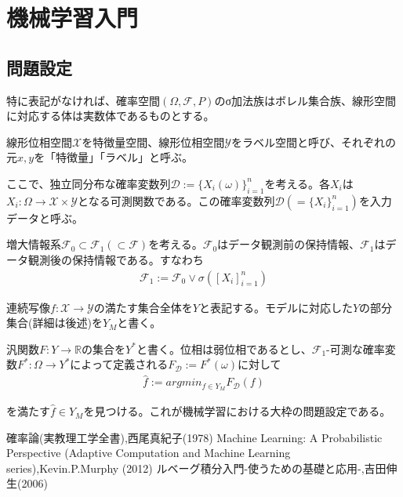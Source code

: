 \documentclass[dvipdfmx, a4paper]{jsarticle}
\begin{document}
\newpage
\section{機械学習入門}
\subsection{問題設定}
特に表記がなければ、確率空間$(\Omega,\mathcal{F},P)$のσ加法族はボレル集合族、線形空間に対応する体は実数体であるものとする。

線形位相空間$\mathcal{X}$を特徴量空間、線形位相空間$\mathcal{Y}$をラベル空間と呼び、それぞれの元$x,y$を「特徴量」「ラベル」と呼ぶ。

ここで、独立同分布な確率変数列$\mathcal{D}:=\{X_i(\omega)\}_{i=1}^n$を考える。各$X_i$は$X_i:\Omega\rightarrow\mathcal{X}\times\mathcal{Y}$となる可測関数である。この確率変数列$\mathcal{D}(=\{X_i\}_{i=1}^n)$を入力データと呼ぶ。

増大情報系$\mathcal{F}_0\subset\mathcal{F}_1(\subset\mathcal{F})$を考える。$\mathcal{F}_0$はデータ観測前の保持情報、$\mathcal{F}_1$はデータ観測後の保持情報である。すなわち
\begin{align}
\mathcal{F}_1:=\mathcal{F}_0\vee\sigma([X_i]^n_{i=1})
\end{align}

連続写像$f:\mathcal{X}\rightarrow\mathcal{Y}$の満たす集合全体を$Y$と表記する。モデルに対応した$Y$の部分集合(詳細は後述)を$Y_M$と書く。

汎関数$F:Y\rightarrow\mathbb{R}$の集合を$Y^*$と書く。位相は弱位相であるとし、$\mathcal{F}_1$-可測な確率変数$F^*:\Omega\rightarrow Y^*$によって定義される$F_\mathcal{D}:=F^*(\omega)$に対して
\begin{align}
\hat{f}:=argmin_{f\in Y_M}F_\mathcal{D}(f)
\end{align}

を満たす$\hat{f}\in Y_M$を見つける。これが機械学習における大枠の問題設定である。



\newpage
\begin{thebibliography}{99}
   確率論(実教理工学全書),西尾真紀子(1978)
   Machine Learning: A Probabilistic Perspective (Adaptive Computation and Machine Learning series),Kevin.P.Murphy (2012)
   ルベーグ積分入門-使うための基礎と応用-,吉田伸生(2006)
\end{thebibliography}
\end{document}
